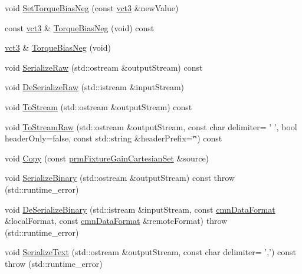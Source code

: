 \begin{DoxyCompactItemize}
void \hyperlink{classprm_fixture_gain_cartesian_set_a160f95d9776aaa96e34a2d57f911d433}{Set\-Torque\-Bias\-Neg} (const \hyperlink{vct_fixed_size_vector_types_8h_a3af82acdbf4eeb73c551909240b106ea}{vct3} \&new\-Value)
\item 
const \hyperlink{vct_fixed_size_vector_types_8h_a3af82acdbf4eeb73c551909240b106ea}{vct3} \& \hyperlink{classprm_fixture_gain_cartesian_set_a77c185549caac86bd5a02e4a42b026c0}{Torque\-Bias\-Neg} (void) const 
\item 
\hyperlink{vct_fixed_size_vector_types_8h_a3af82acdbf4eeb73c551909240b106ea}{vct3} \& \hyperlink{classprm_fixture_gain_cartesian_set_a2d0f913ec4c6d22bb31046109c647408}{Torque\-Bias\-Neg} (void)
\item 
void \hyperlink{classprm_fixture_gain_cartesian_set_a6221139d2e5b0ee3c8c2a1bda4094186}{Serialize\-Raw} (std\-::ostream \&output\-Stream) const 
\item 
void \hyperlink{classprm_fixture_gain_cartesian_set_a9f4d73e24a0faa4e0fe96bb9c966b2be}{De\-Serialize\-Raw} (std\-::istream \&input\-Stream)
\item 
void \hyperlink{classprm_fixture_gain_cartesian_set_a0d129371c093a24405c77f1f3824c7bd}{To\-Stream} (std\-::ostream \&output\-Stream) const 
\item 
void \hyperlink{classprm_fixture_gain_cartesian_set_ad1514250035188e3351aec2efcca7777}{To\-Stream\-Raw} (std\-::ostream \&output\-Stream, const char delimiter= ' ', bool header\-Only=false, const std\-::string \&header\-Prefix=\char`\"{}\char`\"{}) const 
\item 
void \hyperlink{classprm_fixture_gain_cartesian_set_ad128945fdd592fbb136e3603f19e0075}{Copy} (const \hyperlink{classprm_fixture_gain_cartesian_set}{prm\-Fixture\-Gain\-Cartesian\-Set} \&source)
\item 
void \hyperlink{classprm_fixture_gain_cartesian_set_a34d5339a7baac6d8cfafd8dd91655651}{Serialize\-Binary} (std\-::ostream \&output\-Stream) const   throw (std\-::runtime\-\_\-error)
\item 
void \hyperlink{classprm_fixture_gain_cartesian_set_af4e721a09d67a583ff6691cf26a00ef0}{De\-Serialize\-Binary} (std\-::istream \&input\-Stream, const \hyperlink{classcmn_data_format}{cmn\-Data\-Format} \&local\-Format, const \hyperlink{classcmn_data_format}{cmn\-Data\-Format} \&remote\-Format)  throw (std\-::runtime\-\_\-error)
\item 
void \hyperlink{classprm_fixture_gain_cartesian_set_ab755fa6f1cbb829d19b17fffebdbb394}{Serialize\-Text} (std\-::ostream \&output\-Stream, const char delimiter= ',') const   throw (std\-::runtime\-\_\-error)

\end{DoxyCompactItemize}
